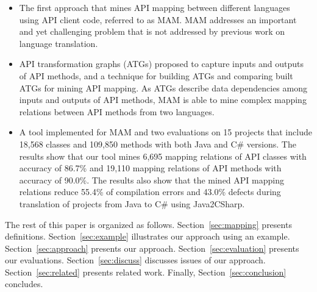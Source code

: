 \begin{itemize}\vspace*{-1.5ex}
\item The first approach that mines API mapping between
different languages using API client code, referred to as MAM. MAM
addresses an important and yet challenging problem that is not
addressed by previous work on language translation.\vspace*{-1.5ex}
\item API transformation graphs (ATGs) proposed to capture inputs
and outputs of API methods, and a technique for building ATGs and
comparing built ATGs for mining API mapping. As ATGs describe data
dependencies among inputs and outputs of API methods, MAM is able to
mine complex mapping relations between API methods from two
languages.\vspace*{-1.5ex}
\item A tool implemented for MAM and two
evaluations on 15 projects that include 18,568 classes and 109,850
methods with both Java and C\# versions. The results show that our
tool mines 6,695 mapping relations of API classes with accuracy of
86.7\% and 19,110 mapping relations of API methods with accuracy of
90.0\%. The results also show that the mined API mapping relations
reduce 55.4\% of compilation errors and 43.0\% defects during
translation of projects from Java to C\# using Java2CSharp.
\end{itemize}\vspace*{-1.5ex}

The rest of this paper is organized as follows.
Section~\ref{sec:mapping} presents definitions.
Section~\ref{sec:example} illustrates our approach using an example.
Section~\ref{sec:approach} presents our approach.
Section~\ref{sec:evaluation} presents our evaluations.
Section~\ref{sec:discuss} discusses issues of our approach.
Section~\ref{sec:related} presents related work.
Finally, Section~\ref{sec:conclusion} concludes.
